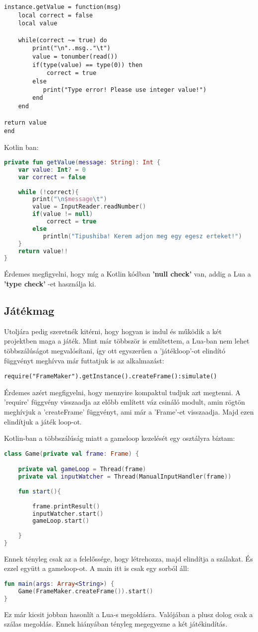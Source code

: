 \scriptsize
\begin{lstlisting}[style=Lua]
instance.getValue = function(msg)
	local correct = false
	local value
	
	while(correct ~= true) do
		print("\n"..msg.."\t")
		value = tonumber(read())
		if(type(value) == type(0)) then
			correct = true
		else
		   print("Type error! Please use integer value!")
		end
	end

return value
end
\end{lstlisting}
Kotlin ban:
\scriptsize
\begin{lstlisting}[language = Kotlin]
private fun getValue(message: String): Int {
	var value: Int? = 0
	var correct = false
	
	while (!correct){
		print("\n$message\t")
		value = InputReader.readNumber()
		if(value != null) 
			correct = true
		else
		   println("Tipushiba! Kerem adjon meg egy egesz erteket!")
	}
	return value!!
}
\end{lstlisting}
\normalsize
Érdemes megfigyelni, hogy míg a Kotlin kódban \textbf{'null check'} van, addig a Lua a \textbf{'type check'} -et használja ki. 

\subsection{Játékmag}

Utoljára pedig szeretnék kitérni, hogy hogyan is indul és működik a két projektben maga a játék. Mint már többször is említettem, a Lua-ban nem lehet többszálúságot megvalósítani, így ott egyszerűen a 'játékloop'-ot elindító függvényt meghívva már futtatjuk is az alkalmazást:
\scriptsize
\begin{lstlisting}[style=Lua]
require("FrameMaker").getInstance().createFrame():simulate()
\end{lstlisting}
\normalsize
Érdemes azért megfigyelni, hogy mennyire kompaktul tudjuk azt megtenni. A 'require' függvény visszaadja az előbb említett váz csináló modult, amin rögtön meghívjuk a 'createFrame' függvényt, ami már a 'Frame'-et visszaadja. Majd ezen elindítjuk a játék loop-ot.

Kotlin-ban a többszálúság miatt a gameloop kezelését egy osztályra bíztam:
\scriptsize
\begin{lstlisting}[language = Kotlin]
class Game(private val frame: Frame) {

	private val gameLoop = Thread(frame)
	private val inputWatcher = Thread(ManualInputHandler(frame))
	
	fun start(){
	
		frame.printResult()
		inputWatcher.start()
		gameLoop.start()
	
	}
}
\end{lstlisting}
\normalsize
Ennek tényleg csak az a felelőssége, hogy létrehozza, majd elindítja a szálakat. És ezzel együtt a gameloop-ot. A main itt is csak egy sorból áll:
\scriptsize
\begin{lstlisting}[language = Kotlin]
fun main(args: Array<String>) {
	Game(FrameMaker.createFrame()).start()
}
\end{lstlisting}
\normalsize
Ez már kicsit jobban hasonlít a Lua-s megoldásra. Valójában a plusz dolog csak a szálas megoldás. Ennek hiányában tényleg megegyezne a két játékindítás.

